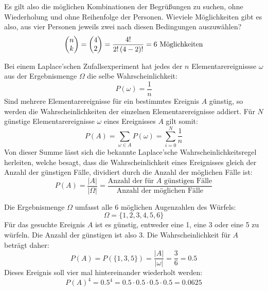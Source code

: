 Es gilt also die m\"{o}glichen Kombinationen der Begr\"{u}\ss{}ungen zu suchen, ohne Wiederholung und ohne Reihenfolge der Personen. Wieviele M\"{o}glichkeiten gibt es also, aus vier Personen jeweils zwei nach diesen Bedingungen auszuw\"{a}hlen? $$\begin{pmatrix}n \\ k\end{pmatrix} = \begin{pmatrix}4 \\ 2\end{pmatrix} = \frac{4!}{2! \, (4 - 2)!} = 6 \text{ M\"{o}glichkeiten}$$

\pagebreak


Bei einem Laplace'schen Zufallsexperiment hat jedes der $n$ Elementarereignissse $\omega$ aus der Ergebnismenge $\Omega$ die selbe Wahrscheinlichkeit: $$P(\omega) = \frac{1}{n}$$ Sind mehrere Elementarereignisse f\"{u}r ein bestimmtes Ereignis $A$ g\"{u}nstig, so werden die Wahrscheinlichkeiten der einzelnen Elementarereignisse addiert. F\"{u}r $N$ g\"{u}nstige Elementarereignisse $\omega$ eines Ereignisses $A$ gilt somit: $$P(A) = \sum_{\omega \in A} P(\omega) = \sum_{i=0}^{N} \frac{1}{n}$$ Von dieser Summe l\"{a}sst sich die bekannte Laplace'sche Wahrscheinlichkeitsregel herleiten, welche besagt, dass die Wahrscheinlichkeit eines Ereignisses gleich der Anzahl der g\"{u}nstigen F\"{a}lle, dividiert durch die Anzahl der m\"{o}glichen F\"{a}lle ist: $$P(A) = \frac{|A|}{|\Omega|} = \frac{\text{Anzahl der f\"{u}r $A$ g\"{u}nstigen F\"{a}lle}}{\text{Anzahl der m\"{o}glichen F\"{a}lle}}$$


Die Ergebnismenge $\Omega$ umfasst alle 6 m\"{o}glichen Augenzahlen des W\"{u}rfels: $$\Omega = \{ 1, 2, 3, 4, 5, 6\}$$ F\"{u}r das gesuchte Ereignis $A$ ist es g\"{u}nstig, entweder eine 1, eine 3 oder eine 5 zu w\"{u}rfeln. Die Anzahl der g\"{u}nstigen ist also 3. Die Wahrscheinlichkeit f\"{u}r $A$ betr\"{a}gt daher: $$P(A) = P(\{1, 3, 5\}) = \frac{|A|}{|\omega|} = \frac{3}{6} = 0.5$$ Dieses Ereignis soll vier mal hintereinander wiederholt werden: $$P(A)^4 = 0.5^4 = 0.5 \cdot 0.5 \cdot 0.5 \cdot 0.5 = 0.0625$$


